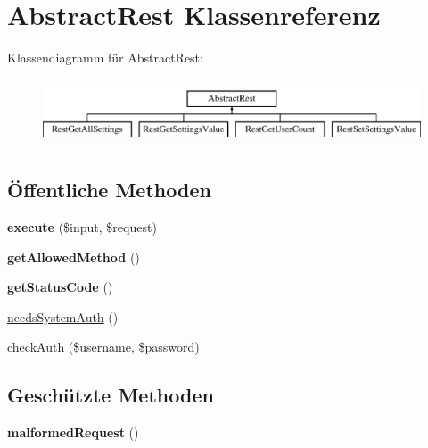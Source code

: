\hypertarget{class_abstract_rest}{}\section{Abstract\+Rest Klassenreferenz}
\label{class_abstract_rest}
Klassendiagramm für Abstract\+Rest\+:\begin{figure}[H]
\begin{center}
\leavevmode
\includegraphics[height=2.000000cm]{class_abstract_rest}
\end{center}
\end{figure}
\subsection*{Öffentliche Methoden}
\begin{DoxyCompactItemize}
\item 
\mbox{\label{class_abstract_rest_ac8f900bd7ee058da4862b5acc7f4470d}} 
{\bfseries execute} (\$input, \$request)
\item 
\mbox{\label{class_abstract_rest_aa382b0deae74d8fc57e484c10c29019c}} 
{\bfseries get\+Allowed\+Method} ()
\item 
\mbox{\label{class_abstract_rest_aa6a17f3aab3ebd433e8a921b1527856c}} 
{\bfseries get\+Status\+Code} ()
\item 
\mbox{\hyperlink{class_abstract_rest_af1a1a4960dfd9cc1e3620fe66b98cb3f}{needs\+System\+Auth}} ()
\item 
\mbox{\hyperlink{class_abstract_rest_a78fbc82135f52b2abb7965a965d612a0}{check\+Auth}} (\$username, \$password)
\end{DoxyCompactItemize}
\subsection*{Geschützte Methoden}
\begin{DoxyCompactItemize}
\item 
\mbox{\label{class_abstract_rest_a0bb8857a0f9362120e229989d851907b}} 
{\bfseries malformed\+Request} ()
\end{DoxyCompactItemize}
